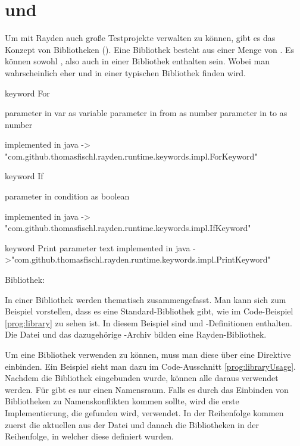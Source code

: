 \section{ und }

Um mit Rayden auch große Testprojekte verwalten zu können, gibt es das Konzept von Bibliotheken (). Eine Bibliothek besteht aus einer Menge von . Es können sowohl ,  also auch  in einer Bibliothek enthalten sein. Wobei man wahrscheinlich eher  und  in einer typischen Bibliothek finden wird.  

\begin{program}
\begin{JavaCode}
keyword For { 
	parameter in var as variable
	parameter in from as number
	parameter in to as number

	implemented in java -> "com.github.thomasfischl.rayden.runtime.keywords.impl.ForKeyword"
}

keyword If { 
	parameter in condition as boolean

	implemented in java -> "com.github.thomasfischl.rayden.runtime.keywords.impl.IfKeyword"
}

keyword Print {
	parameter text
	implemented in java ->"com.github.thomasfischl.rayden.runtime.keywords.impl.PrintKeyword"
}
\end{JavaCode}
\caption{Bibliothek: }
\label{prog:library}
\end{program}

\SuperPar
In einer Bibliothek werden  thematisch zusammengefasst. Man kann sich zum Beispiel vorstellen, dass es eine Standard-Bibliothek gibt, wie im Code-Beispiel \ref{prog:library} zu sehen ist. In diesem Beispiel sind  und -Definitionen enthalten. Die Datei  und das dazugehörige -Archiv bilden eine Rayden-Bibliothek. 

\SuperPar
Um eine Bibliothek verwenden zu können, muss man diese über eine  Direktive einbinden. Ein Beispiel sieht man dazu im Code-Ausschnitt \ref{prog:libraryUsage}. Nachdem die Bibliothek eingebunden wurde, können alle  daraus verwendet werden. Für  gibt es nur einen Namensraum. Falls es durch das Einbinden von Bibliotheken zu Namenskonflikten kommen sollte, wird die erste Implementierung, die gefunden wird, verwendet. In der Reihenfolge kommen zuerst die aktuellen  aus der Datei und danach die Bibliotheken in der Reihenfolge, in welcher diese definiert wurden.


